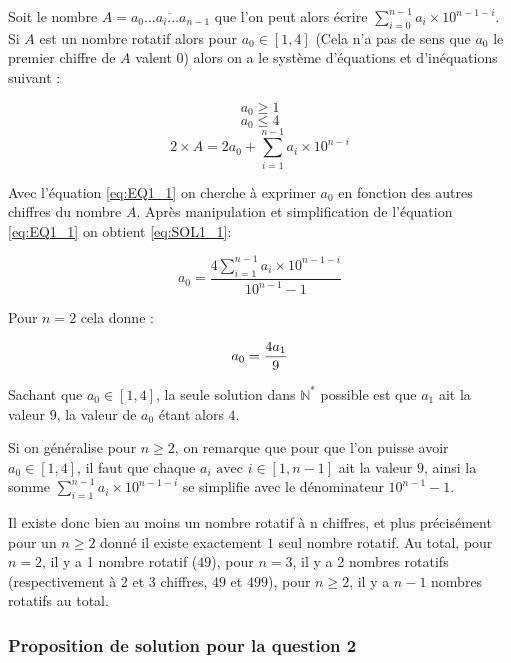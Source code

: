 \documentclass{article}
\begin{document}
Soit le nombre $A = \overline{a_0 \ldots a_i \ldots a_{n-1}}$ que l'on peut alors écrire $\sum_{i=0}^{n-1} a_i \times 10^{n-1-i}$.
Si $A$ est un nombre rotatif alors pour $a_0 \in [1,4]$ (Cela n'a pas de sens que $a_0$ le premier chiffre de $A$ valent $0$) alors on a le système d'équations et d'inéquations suivant :

\begin{equation}
    a_0 \ge 1
    \label{eq:INEQ1_1}
\end{equation}
\begin{equation}
    a_0 \le 4
    \label{eq:INEQ1_2}
\end{equation}
\begin{equation}
    2 \times A = 2a_0 + \sum_{i=1}^{n-1} a_i \times 10^{n-i}
    \label{eq:EQ1_1}
\end{equation}

Avec l'équation \ref{eq:EQ1_1} on cherche à exprimer $a_0$ en fonction des autres chiffres du nombre $A$.
Après manipulation et simplification de l'équation \ref{eq:EQ1_1} on obtient \ref{eq:SOL1_1}:

\begin{equation}
    a_0 = \frac{4\sum_{i=1}^{n-1} a_i \times 10^{n-1-i}}{10^{n-1} - 1} 
    \label{eq:SOL1_1}
\end{equation}

Pour $n=2$ cela donne :

\begin{equation}
    a_0 = \frac{4 a_1}{9}
    \notag
\end{equation}

Sachant que $a_0 \in [1,4]$, la seule solution dans $\mathbb{N}^*$ possible est que $a_1$ ait la valeur $9$, la valeur de $a_0$ étant alors $4$.

Si on généralise pour $n \ge 2$, on remarque que pour que l'on puisse avoir $a_0 \in [1,4]$, il faut que chaque $a_i \text{ avec } i \in [1, n-1]$ ait la valeur $9$, ainsi la somme $\sum_{i=1}^{n-1} a_i \times 10^{n-1-i}$ se simplifie avec le dénominateur $10^{n-1} - 1$.

Il existe donc bien au moins un nombre rotatif à n chiffres, et plus précisément pour un $n \ge 2$ donné il existe exactement $1$ seul nombre rotatif.
Au total, pour $n=2$, il y a 1 nombre rotatif ($49$), pour $n=3$, il y a 2 nombres rotatifs (respectivement à 2 et 3 chiffres, $49$ et $499$), pour $n \ge 2$, il y a $n-1$ nombres rotatifs au total.

\subsubsection{Proposition de solution pour la question 2}
\end{document}
